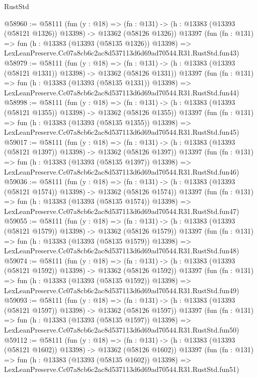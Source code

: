 \begin{lexlean}{RustStd}
\begin{coremodule}
@58960 := @58111
    (fun (y : @18) =>
    (fn : @131) -> (h : @13383 (@13393 (@58121 @1326)) @13398) -> @13362 (@58126 @1326))
    @13397
    (fun (fn : @131) =>
    fun (h : @13383 (@13393 (@58135 @1326)) @13398) =>
    LexLeanPreserve.Cc07a8cb6c2ac8d537113d6d69ad70544.R31.RustStd.fun43)
@58979 := @58111
    (fun (y : @18) =>
    (fn : @131) -> (h : @13383 (@13393 (@58121 @1331)) @13398) -> @13362 (@58126 @1331))
    @13397
    (fun (fn : @131) =>
    fun (h : @13383 (@13393 (@58135 @1331)) @13398) =>
    LexLeanPreserve.Cc07a8cb6c2ac8d537113d6d69ad70544.R31.RustStd.fun44)
@58998 := @58111
    (fun (y : @18) =>
    (fn : @131) -> (h : @13383 (@13393 (@58121 @1355)) @13398) -> @13362 (@58126 @1355))
    @13397
    (fun (fn : @131) =>
    fun (h : @13383 (@13393 (@58135 @1355)) @13398) =>
    LexLeanPreserve.Cc07a8cb6c2ac8d537113d6d69ad70544.R31.RustStd.fun45)
@59017 := @58111
    (fun (y : @18) =>
    (fn : @131) -> (h : @13383 (@13393 (@58121 @1397)) @13398) -> @13362 (@58126 @1397))
    @13397
    (fun (fn : @131) =>
    fun (h : @13383 (@13393 (@58135 @1397)) @13398) =>
    LexLeanPreserve.Cc07a8cb6c2ac8d537113d6d69ad70544.R31.RustStd.fun46)
@59036 := @58111
    (fun (y : @18) =>
    (fn : @131) -> (h : @13383 (@13393 (@58121 @1574)) @13398) -> @13362 (@58126 @1574))
    @13397
    (fun (fn : @131) =>
    fun (h : @13383 (@13393 (@58135 @1574)) @13398) =>
    LexLeanPreserve.Cc07a8cb6c2ac8d537113d6d69ad70544.R31.RustStd.fun47)
@59055 := @58111
    (fun (y : @18) =>
    (fn : @131) -> (h : @13383 (@13393 (@58121 @1579)) @13398) -> @13362 (@58126 @1579))
    @13397
    (fun (fn : @131) =>
    fun (h : @13383 (@13393 (@58135 @1579)) @13398) =>
    LexLeanPreserve.Cc07a8cb6c2ac8d537113d6d69ad70544.R31.RustStd.fun48)
@59074 := @58111
    (fun (y : @18) =>
    (fn : @131) -> (h : @13383 (@13393 (@58121 @1592)) @13398) -> @13362 (@58126 @1592))
    @13397
    (fun (fn : @131) =>
    fun (h : @13383 (@13393 (@58135 @1592)) @13398) =>
    LexLeanPreserve.Cc07a8cb6c2ac8d537113d6d69ad70544.R31.RustStd.fun49)
@59093 := @58111
    (fun (y : @18) =>
    (fn : @131) -> (h : @13383 (@13393 (@58121 @1597)) @13398) -> @13362 (@58126 @1597))
    @13397
    (fun (fn : @131) =>
    fun (h : @13383 (@13393 (@58135 @1597)) @13398) =>
    LexLeanPreserve.Cc07a8cb6c2ac8d537113d6d69ad70544.R31.RustStd.fun50)
@59112 := @58111
    (fun (y : @18) =>
    (fn : @131) -> (h : @13383 (@13393 (@58121 @1602)) @13398) -> @13362 (@58126 @1602))
    @13397
    (fun (fn : @131) =>
    fun (h : @13383 (@13393 (@58135 @1602)) @13398) =>
    LexLeanPreserve.Cc07a8cb6c2ac8d537113d6d69ad70544.R31.RustStd.fun51)

\end{coremodule}
\end{lexlean}
